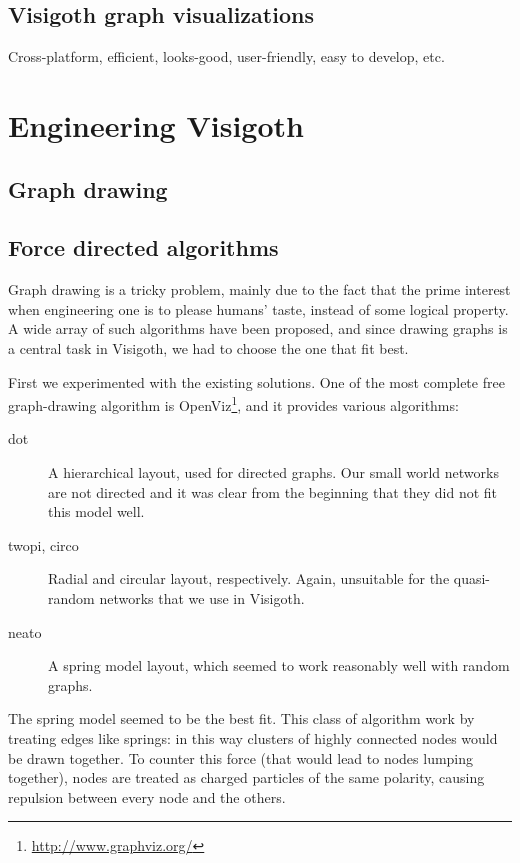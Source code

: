 \documentclass[a4paper,11pt,titlepage]{article}
\let\stdsection\section         %
\renewcommand{\section}{\newpage\stdsection}
\begin{document}
\subsection{Visigoth graph visualizations}

Cross-platform, efficient, looks-good, user-friendly, easy to develop,
etc.



\section{Engineering Visigoth}

\subsection{Graph drawing}

\subsection{Force directed algorithms}
Graph drawing is a tricky problem, mainly due to the fact that the
prime interest when engineering one is to please humans' taste,
instead of some logical property. A wide array of such algorithms have
been proposed, and since drawing graphs is a central task in Visigoth,
we had to choose the one that fit best.

First we experimented with the existing solutions. One of the most
complete free graph-drawing algorithm is
OpenViz\footnote{\url{http://www.graphviz.org/}}, and it provides
various algorithms:

\begin{description}
\item [dot] A hierarchical layout, used for directed graphs. Our small
  world networks are not directed and it was clear from the beginning
  that they did not fit this model well.

\item [twopi, circo] Radial and circular layout, respectively. Again,
  unsuitable for the quasi-random networks that we use in Visigoth.

\item [neato] A spring model layout, which seemed to work reasonably
  well with random graphs.
\end{description}

The spring model seemed to be the best fit. This class of algorithm
work by treating edges like springs: in this way clusters of highly
connected nodes would be drawn together. To counter this force (that
would lead to nodes lumping together), nodes are treated as charged
particles of the same polarity, causing repulsion between every node
and the others.
\end{document}
